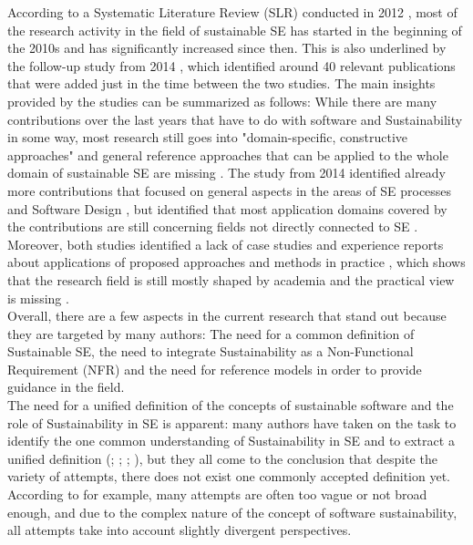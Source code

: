 \documentclass[oribibl]{llncs}
\begin{document}
According to a Systematic Literature Review (SLR) conducted in 2012 \cite{penzenstadler_sustainability_2012}, most of the research activity in the field of sustainable SE has started in the beginning of the 2010s and has significantly increased since then. This is also underlined by the follow-up study from 2014 \cite{penzenstadler_systematic_2014}, which identified around 40 relevant publications that were added just in the time between the two studies. The main insights provided by the studies can be summarized as follows: While there are many contributions over the last years that have to do with software and Sustainability in some way, most research still goes into "domain-specific, constructive approaches" \cite{penzenstadler_sustainability_2012} and general reference approaches that can be applied to the whole domain of sustainable SE are missing \cite{penzenstadler_sustainability_2012}. The study from 2014 identified already more contributions that focused on general aspects in the areas of SE processes and Software Design \cite{penzenstadler_systematic_2014}, but identified that most application domains covered by the contributions are still concerning fields not directly connected to SE \cite{penzenstadler_systematic_2014}. Moreover, both studies identified a lack of case studies and experience reports about applications of proposed approaches and methods in practice \cite{penzenstadler_sustainability_2012}, which shows that the research field is still mostly shaped by academia and the practical view is missing %
\cite{penzenstadler_systematic_2014}.\\
Overall, there are a few aspects in the current research that stand out because they are targeted by many authors: The need for a common definition of Sustainable SE, the need to integrate Sustainability as a Non-Functional Requirement (NFR) and the need for reference models in order to provide guidance in the field.\\
The need for a unified definition of the concepts of sustainable software and the role of Sustainability in SE is apparent: many authors have taken on the task to identify the one common understanding of Sustainability in SE and to extract a unified definition (\cite{venters_software_2014}; \cite{becker_sustainability_2015}; \cite{calero_green_2015}; \cite{penzenstadler_what_13}), but they all come to the conclusion that despite the variety of attempts, there does not exist one commonly accepted definition yet. According to \cite{venters_software_2014} for example, many attempts are often too vague or not broad enough, and due to the complex nature of the concept of software sustainability, all attempts take into account slightly divergent perspectives. %
\end{document}
